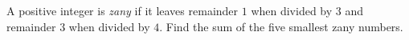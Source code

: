 A positive integer is \emph{zany} if it leaves remainder $1$ when divided by $3$ and remainder $3$ when divided by $4$. Find the sum of the five smallest zany numbers.
